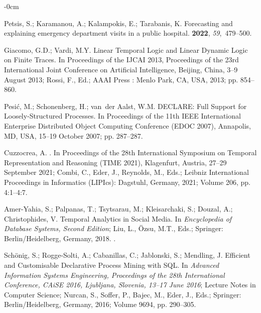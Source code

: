 \documentclass[information,article,accept,pdftex,oneauthor]{Definitions/mdpi}
\begin{document}
\begin{adjustwidth}{-\extralength}{0cm}
\begin{thebibliography}{999}
Petsis, S.; Karamanou, A.; Kalampokis, E.; Tarabanis, K.
\newblock Forecasting and explaining emergency department visits in a public
  hospital.
 {\bf 2022}, {\em
  59},~479--500.

Giacomo, G.D.; Vardi, M.Y.
\newblock Linear Temporal Logic and Linear Dynamic Logic on Finite Traces.
\newblock In Proceedings of the {IJCAI} 2013, Proceedings of the 23rd
  International Joint Conference on Artificial Intelligence, Beijing, China,
  3--9 August 2013; Rossi, F., Ed.; {AAAI Press}%
: Menlo Park, CA, USA,  2013; pp. 854--860.

Pesić, M.; Schonenberg, H.; van~der Aalst, W.M.
\newblock DECLARE: Full Support for Loosely-Structured Processes.
\newblock In Proceedings of the 11th IEEE International Enterprise Distributed
  Object Computing Conference (EDOC 2007), {Annapolis, MD, USA, 15--19 October} %
 2007; pp. 287--287.

Cuzzocrea, A.
.
\newblock In Proceedings of the 28th International Symposium on Temporal
  Representation and Reasoning (TIME 2021), {Klagenfurt, Austria, 27--29 September 2021}; Combi, C., Eder, J., Reynolds, M.,
  Eds.; Leibniz International
  Proceedings in Informatics (LIPIcs): Dagstuhl, Germany,  2021; Volume 206,  pp. 4:1--4:7.

Amer{-}Yahia, S.; Palpanas, T.; Tsytsarau, M.; Kleisarchaki, S.; Douzal, A.;
  Christophides, V.
\newblock Temporal Analytics in Social Media. In {\em Encyclopedia of Database
  Systems, Second Edition}; Liu, L., {\"{O}}zsu, M.T., Eds.; Springer:  {Berlin/Heidelberg, Germany,} %
 2018.
.

Sch{\"{o}}nig, S.; Rogge{-}Solti, A.; Cabanillas, C.; Jablonski, S.; Mendling,
  J.
\newblock Efficient and Customisable Declarative Process Mining with {SQL}.
\newblock In \emph{Advanced Information Systems Engineering, Proceedings of the 28th
  International Conference, CAiSE 2016, Ljubljana, Slovenia, 13--17 June 2016}; Lecture Notes in Computer Science;
  Nurcan, S., Soffer, P., Bajec, M., Eder, J., Eds.; Springer: {Berlin/Heidelberg, Germany,}
  2016; Volume 9694, pp. 290--305.


\end{thebibliography}
\end{adjustwidth}
\end{document}
